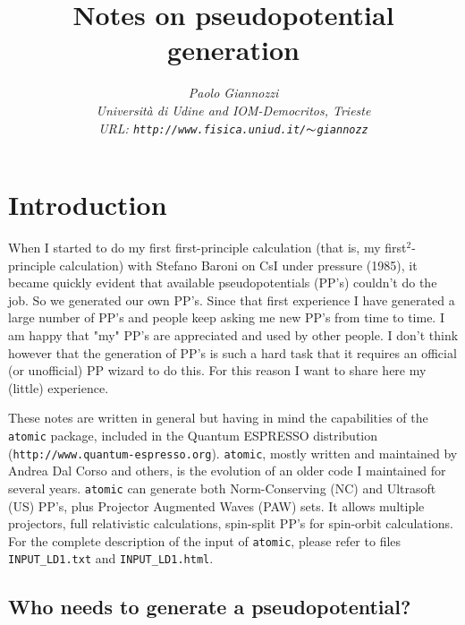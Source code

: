 \documentclass[12pt,a4paper]{article}
\begin{document}
 
\title{Notes on pseudopotential generation}
\author{\em Paolo Giannozzi\\
Universit\`a di Udine and IOM-Democritos, Trieste\\
URL: {\tt http://www.fisica.uniud.it/$\thicksim$giannozz}}
\maketitle
\date
\tableofcontents

\section{Introduction} 

When I started to do my first first-principle calculation
(that is, my first$^2$-principle calculation) with Stefano Baroni
on CsI under pressure (1985), it became quickly evident that
available pseudopotentials (PP's) couldn't do the job. So we 
generated our own PP's. Since that first experience I have 
generated a large number of PP's and people keep asking me 
new PP's from time to time. I am happy that "my" PP's are 
appreciated and used by other people. I don't think however 
that the generation of PP's is such a hard task that it requires 
an official (or unofficial) PP wizard to do this. For this reason 
I want to share here my (little) experience.

These notes are written in general but having in mind the capabilities of
the {\tt atomic} package, included in the {\sc Quantum ESPRESSO} 
distribution 
(\texttt{http://www.quantum-espresso.org}). {\tt atomic}, mostly written
and maintained by Andrea Dal Corso and others, is the evolution of 
an older code I maintained for several years. {\tt atomic} can generate 
both Norm-Conserving (NC) \cite{NC} and Ultrasoft (US) \cite{van} PP's,
plus Projector Augmented Waves (PAW) \cite{PAW} sets.
It allows multiple projectors, full relativistic calculations,
spin-split PP's for spin-orbit calculations.
For the complete description of the input of \texttt{atomic},
please refer to files \texttt{INPUT\_LD1.txt} and 
\texttt{INPUT\_LD1.html}.

\subsection{Who needs to generate a pseudopotential?}
\end{document}
